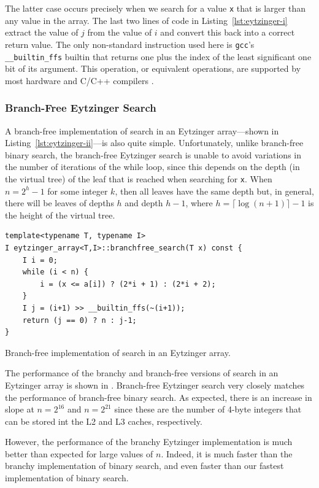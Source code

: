 \documentclass{patmorin}
\newcommand{\lstlabel}[1]{\label{lst:#1}}
\newcommand{\lstref}[1]{Listing~\ref{lst:#1}}
\begin{document}
The latter case occurs precisely when we search for a value
\texttt{x} that is larger than any value in the array. The
last two lines of code in \lstref{eytzinger-i} extract the value of $j$
from the value of $i$ and convert this back into a correct return value.
The only non-standard instruction used here is \texttt{gcc}'s
\texttt{__builtin_ffs} builtin that returns one plus the index
of the least significant one bit of its argument.  This operation,
or equivalent operations, are supported by most hardware and C/C++
compilers \cite{wiki:find}.

\subsubsection{Branch-Free Eytzinger Search}

A branch-free implementation of search in an Eytzinger array---shown
in \lstref{eytzinger-ii}---is also quite simple. Unfortunately, unlike
branch-free binary search, the branch-free Eytzinger search is unable
to avoid variations in the number of iterations of the while loop,
since this depends on the depth (in the virtual tree) of the leaf that
is reached when searching for \texttt{x}.  When $n=2^h-1$ for
some integer $k$, then all leaves have the same depth but, in general,
there will be leaves of depths $h$ and depth $h-1$, where $h=\lceil\log
(n+1)\rceil-1$ is the height of the virtual tree.

\begin{listing}
\begin{verbatim}
template<typename T, typename I>
I eytzinger_array<T,I>::branchfree_search(T x) const {
    I i = 0;
    while (i < n) {
        i = (x <= a[i]) ? (2*i + 1) : (2*i + 2);
    }
    I j = (i+1) >> __builtin_ffs(~(i+1));
    return (j == 0) ? n : j-1;
}
\end{verbatim}
\caption{Branch-free implementation of search in an Eytzinger array.}
\lstlabel{eytzinger-ii}
\end{listing}

The performance of the branchy and branch-free versions of search
in an Eytzinger array is shown in .  Branch-free
Eytzinger search very closely matches the performance of branch-free
binary search. As expected, there is an increase in slope at $n=2^{16}$
and $n=2^{21}$ since these are the number of 4-byte integers that can
be stored int the L2 and L3 caches, respectively.

However, the performance of the branchy Eytzinger implementation is
much better than expected for large values of $n$. Indeed, it is much
faster than the branchy implementation of binary search, and even
faster than our fastest implementation of binary search.
\end{document}
